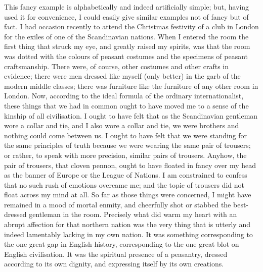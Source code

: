 \documentclass{book}
\begin{document}
This fancy example is alphabetically and indeed artificially simple; but, having used it for convenience, I could easily give similar examples not of fancy but of fact. I had occasion recently to attend the Christmas festivity of a club in London for the exiles of one of the Scandinavian nations. When I entered the room the first thing that struck my eye, and greatly raised my spirits, was that the room was dotted with the colours of peasant costumes and the specimens of peasant craftsmanship. There were, of course, other costumes and other crafts in evidence; there were men dressed like myself (only better) in the garb of the modern middle classes; there was furniture like the furniture of any other room in London. Now, according to the ideal formula of the ordinary internationalist, these things that we had in common ought to have moved me to a sense of the kinship of all civilisation. I ought to have felt that as the Scandinavian gentleman wore a collar and tie, and I also wore a collar and tie, we were brothers and nothing could come between us. I ought to have felt that we were standing for the same principles of truth because we were wearing the same pair of trousers; or rather, to speak with more precision, similar pairs of trousers. Anyhow, the pair of trousers, that cloven pennon, ought to have floated in fancy over my head as the banner of Europe or the League of Nations. I am constrained to confess that no such rush of emotions overcame me; and the topic of trousers did not float across my mind at all. So far as those things were concerned, I might have remained in a mood of mortal enmity, and cheerfully shot or stabbed the best-dressed gentleman in the room. Precisely what did warm my heart with an abrupt affection for that northern nation was the very thing that is utterly and indeed lamentably lacking in my own nation. It was something corresponding to the one great gap in English history, corresponding to the one great blot on English civilisation. It was the spiritual presence of a peasantry, dressed according to its own dignity, and expressing itself by its own creations.
\end{document}
